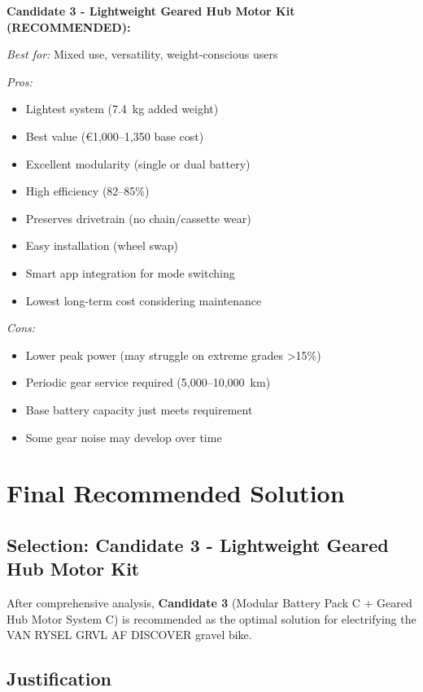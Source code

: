 \documentclass[12pt,a4paper]{article}
\begin{document}
\textbf{Candidate 3 - Lightweight Geared Hub Motor Kit (RECOMMENDED):}

\textit{Best for:} Mixed use, versatility, weight-conscious users

\textit{Pros:}
\begin{itemize}
    \item Lightest system (7.4~kg added weight)
    \item Best value (€1,000--1,350 base cost)
    \item Excellent modularity (single or dual battery)
    \item High efficiency (82--85\%)
    \item Preserves drivetrain (no chain/cassette wear)
    \item Easy installation (wheel swap)
    \item Smart app integration for mode switching
    \item Lowest long-term cost considering maintenance
\end{itemize}

\textit{Cons:}
\begin{itemize}
    \item Lower peak power (may struggle on extreme grades >15\%)
    \item Periodic gear service required (5,000--10,000~km)
    \item Base battery capacity just meets requirement
    \item Some gear noise may develop over time
\end{itemize}

\section{Final Recommended Solution}

\subsection{Selection: Candidate 3 - Lightweight Geared Hub Motor Kit}

After comprehensive analysis, \textbf{Candidate 3} (Modular Battery Pack C + Geared Hub Motor System C) is recommended as the optimal solution for electrifying the VAN RYSEL GRVL AF DISCOVER gravel bike.

\subsection{Justification}
\end{document}

